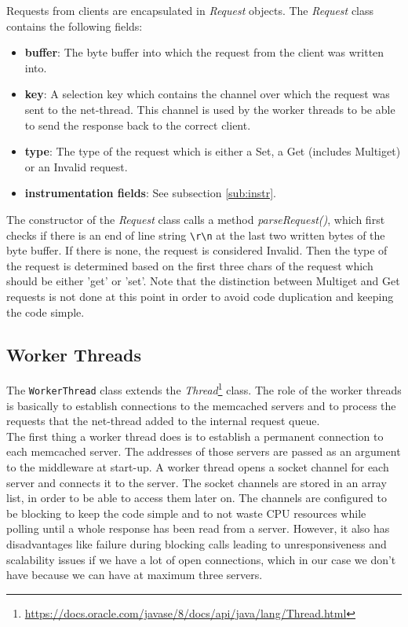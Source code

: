 Requests from clients are encapsulated in \textit{Request} objects. The \textit{Request} class contains the following fields: 
\begin{itemize}
    \item \textbf{buffer}: The byte buffer into which the request from the client was written into.
    \item \textbf{key}: A selection key which contains the channel over which the request was sent to the net-thread. This channel is used by the worker threads to be able to send the response back to the correct client. 
    \item \textbf{type}: The type of the request which is either a Set, a Get (includes Multiget) or an Invalid request. 
    \item \textbf{instrumentation fields}: See subsection \ref{sub:instr}.
\end{itemize}
The constructor of the \textit{Request} class calls a method \textit{parseRequest()}, which first checks if there is an end of line string \texttt{\textbackslash r\textbackslash n} at the last two written bytes of the byte buffer. If there is none, the request is considered Invalid. Then the type of the request is determined based on the first three chars of the request which should be either 'get' or 'set'. Note that the distinction between Multiget and Get requests is not done at this point in order to avoid code duplication and keeping the code simple. 

\subsection{Worker Threads}
The \texttt{WorkerThread} class extends the \textit{Thread}\footnote{\url{https://docs.oracle.com/javase/8/docs/api/java/lang/Thread.html}} class. 
The role of the worker threads is basically to establish connections to the memcached servers and to process the requests that the net-thread added to the internal request queue. \\

The first thing a worker thread does is to establish a permanent connection to each memcached server. The addresses of those servers are passed as an argument to the middleware at start-up. A worker thread opens a socket channel for each server and connects it to the server. The socket channels are stored in an array list, in order to be able to access them later on. The channels are configured to be blocking to keep the code simple and to not waste CPU resources while polling until a whole response has been read from a server. However, it also has disadvantages like failure during blocking calls leading to unresponsiveness and scalability issues if we have a lot of open connections, which in our case we don't have because we can have at maximum three servers. \\

